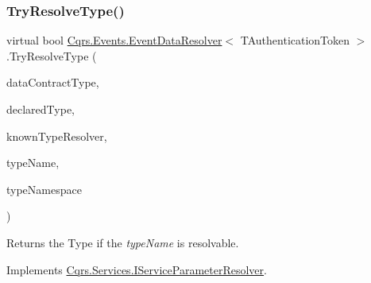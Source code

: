 \subsubsection{\texorpdfstring{Try\+Resolve\+Type()}{TryResolveType()}}
{\footnotesize\ttfamily virtual bool \hyperlink{classCqrs_1_1Events_1_1EventDataResolver}{Cqrs.\+Events.\+Event\+Data\+Resolver}$<$ T\+Authentication\+Token $>$.Try\+Resolve\+Type (\begin{DoxyParamCaption}\item[{Type}]{data\+Contract\+Type,  }\item[{Type}]{declared\+Type,  }\item[{Data\+Contract\+Resolver}]{known\+Type\+Resolver,  }\item[{out Xml\+Dictionary\+String}]{type\+Name,  }\item[{out Xml\+Dictionary\+String}]{type\+Namespace }\end{DoxyParamCaption})\hspace{0.3cm}{\ttfamily [virtual]}}



Returns the Type if the {\itshape type\+Name}  is resolvable. 



Implements \hyperlink{interfaceCqrs_1_1Services_1_1IServiceParameterResolver_a31c82a00b192b877faff6df99e1b689b_a31c82a00b192b877faff6df99e1b689b}{Cqrs.\+Services.\+I\+Service\+Parameter\+Resolver}.

